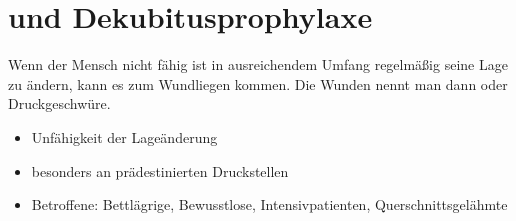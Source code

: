 \section{ und Dekubitusprophylaxe}
\label{topic:dekubitusprophylaxe}

{%
Wenn
der Mensch nicht fähig ist in ausreichendem Umfang
regelmäßig seine Lage zu ändern, kann es zum Wundliegen
kommen. Die Wunden nennt man dann  oder
Druckgeschwüre.
\Z{}
}
{
\begin{itemize}
  \item Unfähigkeit der Lageänderung
  \item besonders an prädestinierten Druckstellen
  \item Betroffene: Bettlägrige, Bewusstlose, Intensivpatienten,
  Querschnittsgelähmte
\end{itemize}
}{}{}{}



